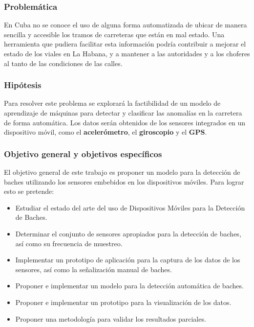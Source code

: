 	\subsubsection*{Problemática}
		En Cuba no se conoce el uso de alguna forma automatizada de ubicar de manera sencilla y accesible los tramos de carreteras que están en mal estado. 
		Una herramienta que pudiera facilitar esta información podría contribuir a mejorar el estado de los viales en La Habana, y a mantener a las autoridades y a 
		los choferes al tanto de las condiciones de las calles.
		
	\subsubsection*{Hipótesis}
		Para resolver este problema se explorará la factibilidad de un modelo de aprendizaje de máquinas para detectar y clasificar las anomalías en la
		carretera de forma automática. Los datos serán obtenidos de los sensores integrados en un dispositivo móvil, como el \textbf{acelerómetro},
		el \textbf{giroscopio} y el \textbf{GPS}.

	\subsubsection*{Objetivo general y objetivos específicos}
		El objetivo general de este trabajo es proponer un modelo para la detección de baches utilizando los sensores embebidos en los
		dispositivos móviles. Para lograr esto se pretende:

		\begin{itemize}
			\item Estudiar el estado del arte del uso de Dispositivos Móviles para la Detección de Baches.
			\item Determinar el conjunto de sensores apropiados para la detección de baches, así como su frecuencia de muestreo.
			\item Implementar un prototipo de aplicación para la captura de los datos de los sensores, así como la señalización
				manual de baches.
			\item Proponer e implementar un modelo para la detección automática de baches.
			\item Proponer e implementar un prototipo para la visualización de los datos.
			\item Proponer una metodología para validar los resultados parciales.
		\end{itemize}


